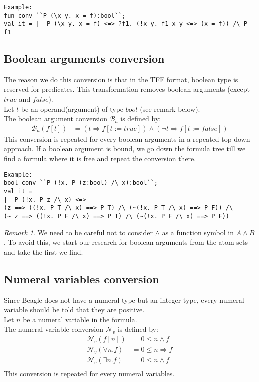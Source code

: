 \documentclass[a4paper, 11pt]{article}
\theoremstyle{plain}
\theoremstyle{definition}
\theoremstyle{remark}
\newtheorem*{remark}{Remark}
\begin{document}
\scriptsize
\begin{Verbatim}[frame=single]
Example:
fun_conv ``P (\x y. x = f):bool``;
val it = |- P (\x y. x = f) <=> ?f1. (!x y. f1 x y <=> (x = f)) /\ P f1
\end{Verbatim} 
\normalsize

  
\subsection{Boolean arguments conversion}
The reason we do this conversion is that in the TFF format, boolean type is reserved for predicates.
This transformation removes boolean arguments (except $true$ and $false$).
\\Let $t$ be an operand(argument) of type $bool$ (see remark below).
\\The boolean argument conversion $\mathcal{B}_a$ is defined by: 
\[\begin{aligned}
  \mathcal{B}_a (f[t]) &= (t \Rightarrow f[t := true]) \wedge (\neg t \Rightarrow f[t := false]) 
\end{aligned}\]
This conversion is repeated for every boolean arguments in a repeated top-down approach. If a boolean argument is bound, we go down the formula tree till we find a formula where it is free and repeat the conversion there.

\scriptsize
\begin{Verbatim}[frame=single]
Example:
bool_conv ``P (!x. P (z:bool) /\ x):bool``;
val it =
|- P (!x. P z /\ x) <=>
(z ==> ((!x. P T /\ x) ==> P T) /\ (~(!x. P T /\ x) ==> P F)) /\
(~ z ==> ((!x. P F /\ x) ==> P T) /\ (~(!x. P F /\ x) ==> P F))
\end{Verbatim} 
\normalsize

\begin{remark}
We need to be careful not to consider $\wedge$ as a function symbol in $A \wedge B$. To avoid this, we start our research for boolean arguments from the atom sets and take the first we find.
\end{remark}


\subsection{Numeral variables conversion}
Since Beagle does not have a numeral type but an integer type, every numeral variable should be told that they are positive.
\\Let $n$ be a numeral variable in the formula.
\\The numeral variable conversion $\mathcal{N}_v$ is defined by:
\[\begin{aligned}
  \mathcal{N}_v(f[n]) &= 0 \leq n \wedge f\\
  \mathcal{N}_v(\forall n. f) &= 0 \leq n \Rightarrow f\\ 
  \mathcal{N}_v(\exists n. f) &= 0 \leq n \wedge f \\
  \end{aligned}
  \]
This conversion is repeated for every numeral variables.
\end{document}
